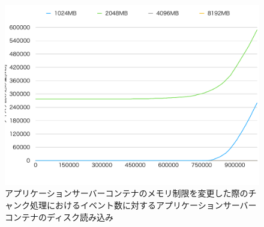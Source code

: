 \documentclass[../../../../../main]{subfiles}
\begin{document}
    \begin{figure}[H]
        \centering
        \includegraphics[width=12cm]{graph}
        \caption{アプリケーションサーバーコンテナのメモリ制限を変更した際のチャンク処理におけるイベント数に対するアプリケーションサーバーコンテナのディスク読み込み}
        \label{fig:stream-change-app-memory-limit-app-disk-out-app_4_db_1_1024}
    \end{figure}
\end{document}
